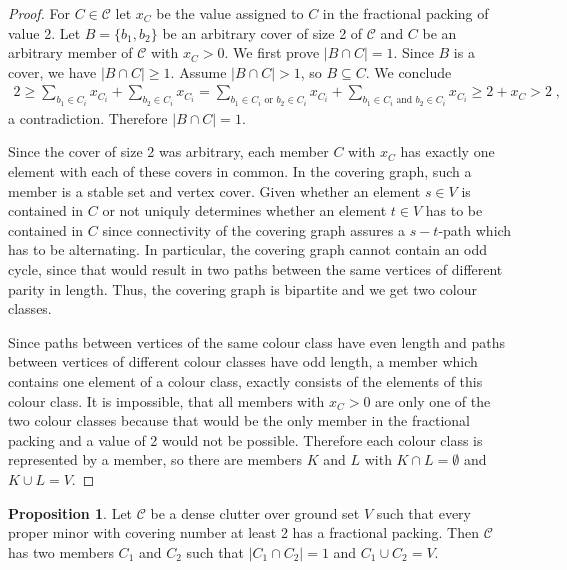 \documentclass[a4paper, 12pt, twoside=false]{scrbook}
\theoremstyle{definition}
\newtheorem{proposition}[theorem]{Proposition}
\begin{document}
   \begin{proof}
       For $C \in \mathcal{C}$ let $x_C$ be the value assigned to $C$ in the fractional packing of value 2.
       Let $B=\{b_1,b_2\}$ be an arbitrary cover of size 2 of $\mathcal{C}$ and $C$ be an arbitrary member of $\mathcal{C}$ with $x_{C} > 0$.
       We first prove $|B\cap C| = 1$.
       Since $B$ is a cover, we have $|B\cap C| \geq 1$.
       Assume $|B \cap C| > 1$, so $B \subseteq C$.
       We conclude
       \begin{align*}
           2 \geq \sum_{b_1 \in C_i} x_{C_i} + \sum_{b_2 \in C_i} x_{C_i} = \sum_{b_1 \in C_i \text{ or } b_2 \in C_i} x_{C_i} + \sum_{b_1 \in C_i \text{ and } b_2 \in C_i} x_{C_i} \geq 2 + x_C > 2 \;,
       \end{align*}
       a contradiction. Therefore $|B\cap C| = 1$.

       Since the cover of size 2 was arbitrary, each member $C$ with $x_C$ has exactly one element with each of these covers in common.
       In the covering graph, such a member is a stable set and vertex cover.
       Given whether an element $s \in V$ is contained in $C$ or not uniquly determines whether an element $t \in V$ has to be contained in $C$ since connectivity of the covering graph assures a $s-t$-path which has to be alternating.
       In particular, the covering graph cannot contain an odd cycle, since that would result in two paths between the same vertices of different parity in length. Thus, the covering graph is bipartite and we get two colour classes.

       Since paths between vertices of the same colour class have even length and paths between vertices of different colour classes have odd length, a member which contains one element of a colour class, exactly consists of the elements of this colour class.
       It is impossible, that all members with $x_C > 0$ are only one of the two colour classes because that would be the only member in the fractional packing and a value of 2 would not be possible.
       Therefore each colour class is represented by a member, so there are members $K$ and $L$ with $K \cap L = \emptyset$ and $K \cup L = V$.

   \end{proof}

   \begin{proposition}\label{twomember}
       Let $\mathcal{C}$ be a dense clutter over ground set $V$ such that every proper minor with covering number at least 2 has a fractional packing.
       Then $\mathcal{C}$ has two members $C_1$ and $C_2$ such that $|C_1 \cap C_2|=1$ and $C_1 \cup C_2 = V$.
   \end{proposition}
\end{document}
